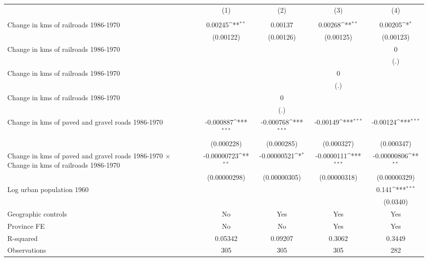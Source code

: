 {
\def\sym#1{\ifmmode^{#1}\else\(^{#1}\)\fi}
\begin{tabular}{l*{4}{c}}
\hline\hline
                &\multicolumn{1}{c}{(1)}&\multicolumn{1}{c}{(2)}&\multicolumn{1}{c}{(3)}&\multicolumn{1}{c}{(4)}\\
                &\multicolumn{1}{c}{}&\multicolumn{1}{c}{}&\multicolumn{1}{c}{}&\multicolumn{1}{c}{}\\
\hline
Change in kms of railroads 1986-1970&  0.00245\sym{**} &  0.00137         &  0.00268\sym{**} &  0.00205\sym{*}  \\
                &(0.00122)         &(0.00126)         &(0.00125)         &(0.00123)         \\
[1em]
Change in kms of railroads 1986-1970&                  &                  &                  &        0         \\
                &                  &                  &                  &      (.)         \\
[1em]
Change in kms of railroads 1986-1970&                  &                  &        0         &                  \\
                &                  &                  &      (.)         &                  \\
[1em]
Change in kms of railroads 1986-1970&                  &        0         &                  &                  \\
                &                  &      (.)         &                  &                  \\
[1em]
Change in kms of paved and gravel roads 1986-1970&-0.000887\sym{***}&-0.000768\sym{***}& -0.00149\sym{***}& -0.00124\sym{***}\\
                &(0.000228)         &(0.000285)         &(0.000327)         &(0.000347)         \\
[1em]
Change in kms of paved and gravel roads 1986-1970 $\times$ Change in kms of railroads 1986-1970&-0.00000723\sym{**} &-0.00000521\sym{*}  &-0.0000111\sym{***}&-0.00000806\sym{**} \\
                &(0.00000298)         &(0.00000305)         &(0.00000318)         &(0.00000329)         \\
[1em]
Log urban population 1960&                  &                  &                  &    0.141\sym{***}\\
                &                  &                  &                  & (0.0340)         \\
\hline
Geographic controls&       No         &      Yes         &      Yes         &      Yes         \\
Province FE     &       No         &       No         &      Yes         &      Yes         \\
R-squared       &  0.05342         &  0.09207         &   0.3062         &   0.3449         \\
Observations    &      305         &      305         &      305         &      282         \\
\hline\hline
\end{tabular}
}
